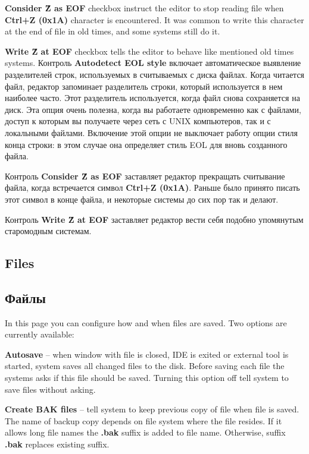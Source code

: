 {\bf Consider \^Z as EOF} checkbox instruct the editor to stop reading file when
{\bf Ctrl+Z (0x1A)} character is encountered. It was common to write this
character at the end of file in old times, and some systems still do it.

{\bf Write \^Z at EOF} checkbox tells the editor to behave like mentioned
old times systems.
\else
Контроль {\bf Autodetect EOL style} включает автоматическое выявление разделителей
строк, используемых в считываемых с диска файлах. Когда читается файл, редактор
запоминает разделитель строки, который используется в нем наиболее часто. Этот
разделитель используется, когда файл снова сохраняется на диск. Эта опция очень
полезна, когда вы работаете одновременно как с файлами, доступ к которым вы
получаете через сеть с UNIX компьютеров, так и с локальными файлами. Включение
этой опции не выключает работу опции стиля конца строки:  в этом случае она
определяет стиль EOL для вновь созданного файла.

Контроль {\bf Consider \^Z as EOF} заставляет редактор прекращать считывание файла,
когда встречается символ {\bf Ctrl+Z (0x1A)}. Раньше было принято писать этот
символ в конце файла, и некоторые системы до сих пор так и делают.

Контроль {\bf Write \^Z at EOF} заставляет редактор вести себя подобно упомянутым
старомодным системам.
\fi
\ifenglish
\subsection{Files}
\else
\subsection{Файлы}
\fi
{}

\ifenglish
In this page you can configure how and when files are saved. Two options are
currently available:

{\bf Autosave} -- when window with file is closed, IDE is exited or external tool
is started, system saves all changed files to the disk. Before saving each file the
systems asks if this file should be saved. Turning this option off tell system
to save files without asking.

{\bf Create BAK files} -- tell system to keep previous copy of file when file is saved.
The name of backup copy depends on file system where the file resides.
If it allows long file names the {\bf .bak} suffix is added to file name.
Otherwise, suffix {\bf .bak} replaces existing suffix.


